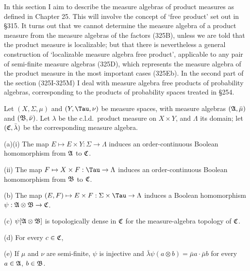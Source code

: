 
\def\chaptername{Measure algebras}
\def\sectionname{Free products and product measures}


In this section I aim to describe the measure algebras of product
measures as defined in Chapter 25.   This will involve the concept of
`free product' set out in \S315.   It turns out that we cannot determine
the measure algebra of a product measure from the measure algebras of
the factors (325B), unless we are told that
the product measure is localizable;  but that
there is nevertheless a general construction of `localizable measure
algebra free product', applicable to any pair of semi-finite measure
algebras (325D), which represents the measure algebra of the product
measure in the most important cases (325Eb).   In the second part of the
section (325I-325M) I deal with
measure algebra free products of probability algebras, corresponding to
the products of probability spaces treated in \S254.

 Let $(X,\Sigma,\mu)$ and $(Y,\Tau,\nu)$ be
measure spaces, with measure algebras $(\frak A,\bar\mu)$ and
$(\frak B,\bar\nu)$.   Let $\lambda$ be the c.l.d.\ product measure on
$X\times Y$, and $\Lambda$ its domain;  let $(\frak C,\bar\lambda)$ be
the corresponding measure algebra.

(a)(i) The map $E\mapsto E\times Y:\Sigma\to\Lambda$ induces an
order-continuous Boolean homomorphism from $\frak A$ to $\frak C$.

\quad(ii) The map $F\mapsto X\times F:\Tau\to\Lambda$ induces an
order-continuous Boolean homomorphism from $\frak B$ to $\frak C$.

(b) The map $(E,F)\mapsto E\times F:\Sigma\times\Tau\to\Lambda$ induces
a Boolean homomorphism $\psi:\frak A\otimes\frak B\to\frak C$.

(c) $\psi[\frak A\otimes\frak B]$ is topologically dense in $\frak C$ for
the measure-algebra topology of $\frak C$.

(d) For every $c\in\frak C$,


(e) If $\mu$ and $\nu$ are semi-finite, $\psi$ is injective and
$\bar\lambda\psi(a\otimes b)=\bar\mu a\cdot\bar\mu b$ for every
$a\in\frak A$, $b\in\frak B$.

